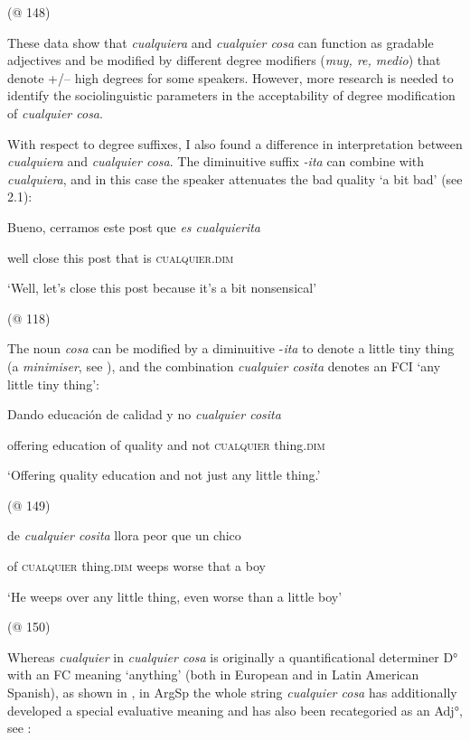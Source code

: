 \documentclass[output=paper]{langscibook}
\begin{document}
    (@ 148)

These data show that \textit{cualquiera} and \textit{cualquier cosa} can function as gradable adjectives and be modified by different degree modifiers (\textit{muy, re, medio}) that denote +/– high degrees for some speakers. However, more research is needed to identify the sociolinguistic parameters in the acceptability of degree modification of \textit{cualquier cosa}. 

  With respect to degree suffixes, I also found a difference in interpretation between \textit{cualquiera} and \textit{cualquier cosa}. The diminuitive suffix \textit{-ita} can combine with \textit{cualquiera}, and in this case the speaker attenuates the bad quality ‘a bit bad’ (see 2.1):

    Bueno,  cerramos  este  post  que  \textit{es  cualquierita}

    well  close  this  post  that  is  \textsc{cualquier}.\textsc{dim}

    ‘Well, let’s close this post because it’s a bit nonsensical’

    (@ 118)

The noun \textit{cosa} can be modified by a diminuitive -\textit{ita} to denote a little tiny thing (a \textit{minimiser}, see \citealt{Krifka1995}), and the combination \textit{cualquier cosita} denotes an FCI ‘any little tiny thing’:

    Dando  educación  de  calidad  y  no  \textit{cualquier  cosita}

    offering  education  of  quality  and  not  \textsc{cualquier}  thing.\textsc{dim}

    ‘Offering quality education and not just any little thing.’

    (@ 149)

    de  \textit{cualquier  cosita} llora  peor  que  un  chico

    of  \textsc{cualquier}  thing.\textsc{dim}  weeps  worse  that  a  boy

    ‘He weeps over any little thing, even worse than a little boy’

    (@ 150)

Whereas \textit{cualquier} in \textit{cualquier cosa} is originally a quantificational determiner D° with an FC meaning ‘anything’ (both in European and in Latin American Spanish), as shown in , in ArgSp the whole string \textit{cualquier cosa} has additionally developed a special evaluative meaning and has also been recategoried as an Adj°, see :
\end{document}
